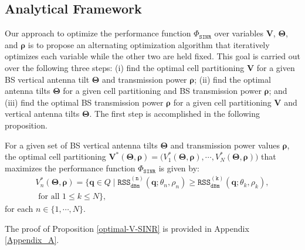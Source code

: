 \subsection{Analytical Framework}\label{SINR-Analytical-Framework}

Our approach to optimize the performance function $\Phi_{\mathtt{SINR}}$ over variables $\bm{V}$, $\bm{\Theta}$, and $\bm{\rho}$ is to propose an alternating optimization algorithm that iteratively optimizes each variable while the other two are held fixed. This goal is carried out over the following three steps: (i) find the optimal cell partitioning $\bm{V}$ for a given BS vertical antenna tilt $\bm{\Theta}$ and transmission power $\bm{\rho}$; (ii) find the optimal antenna tilts $\bm{\Theta}$ for a given cell partitioning and BS transmission power $\bm{\rho}$; and (iii) find the optimal BS transmission power $\bm{\rho}$ for a given cell partitioning $\bm{V}$ and vertical antenna tilts $\bm{\Theta}$. The first step is accomplished in the following proposition. 
\begin{Proposition}\label{optimal-V-SINR}
For a given set of BS vertical antenna tilts $\bm{\Theta}$ and transmission power values $\bm{\rho}$, the optimal cell partitioning $\bm{V}^*(\bm{\Theta}, \bm{\rho}) = \big(V_1^*(\bm{\Theta}, \bm{\rho}), \cdots, V_N^*(\bm{\Theta}, \bm{\rho})\big)$ that maximizes the performance function $\Phi_{\mathtt{SINR}}$ is given by:
\begin{multline}\label{optimal-cell-partitioning-SINR}
    \!\!\! V_n^*(\bm{\Theta}, \bm{\rho}) \!=\! \big\{\bm{q} \in Q \mid \mathtt{RSS_{dBm}^{(n)}}(\bm{q}; \theta_n, \rho_n) \geq \mathtt{RSS_{dBm}^{(k)}}(\bm{q}; \theta_k, \rho_k), \\ \textrm{ for all } 1 \leq k \leq N \big\},
\end{multline}
for each $n \in \{1, \cdots, N\}$.
\end{Proposition}
The proof of Proposition \ref{optimal-V-SINR} is provided in Appendix \ref{Appendix_A}.


